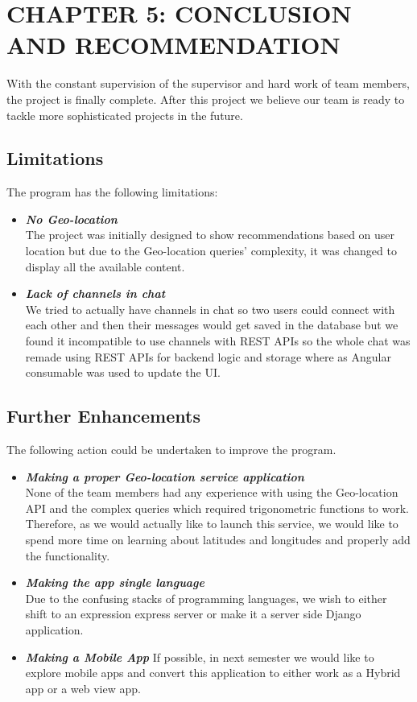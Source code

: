 \documentclass[12pt]{article}
\begin{document}
\clearpage

\section{CHAPTER 5: CONCLUSION AND RECOMMENDATION}
With the constant supervision of the supervisor and hard work of team members, the project is finally complete. After this project we believe our team is 
ready to tackle more sophisticated projects in the future.

\subsection{Limitations}
\vspace*{5mm}
The program has the following limitations:
\begin{itemize}
    \item \textit{\textbf{No Geo-location}}\\
        The project was initially designed to show recommendations based on user location but due to the Geo-location queries' complexity, it was changed to display all the available content.
    \item \textit{\textbf{Lack of channels in chat}}\\
        We tried to actually have channels in chat so two users could connect with each other and then their messages would get saved in the database but we found it incompatible to use channels with REST APIs so the whole chat was remade using REST APIs for backend logic and storage where as Angular consumable was used to update the UI. 
\end{itemize}
\vspace*{5mm}
\subsection{Further Enhancements}
\vspace*{5mm}
The following action could be undertaken to improve the program.
\begin{itemize}
    \item \textit{\textbf{Making a proper Geo-location service application}}\\
        None of the team members had any experience with using the Geo-location API and the complex queries which required trigonometric functions to work. Therefore, as we would actually like to launch this service, we would like to spend more time on learning about latitudes and longitudes and properly add the functionality.

    \item \textit{\textbf{Making the app single language}}\\
        Due to the confusing stacks of programming languages, we wish to either shift to an expression express server or make it a server side Django application.
    \item  \textit{\textbf{Making a Mobile App}} 
        If possible, in next semester we would like to explore mobile apps and convert this application to either work as a Hybrid app or a web view app.
\end{itemize}
\clearpage
\end{document}
